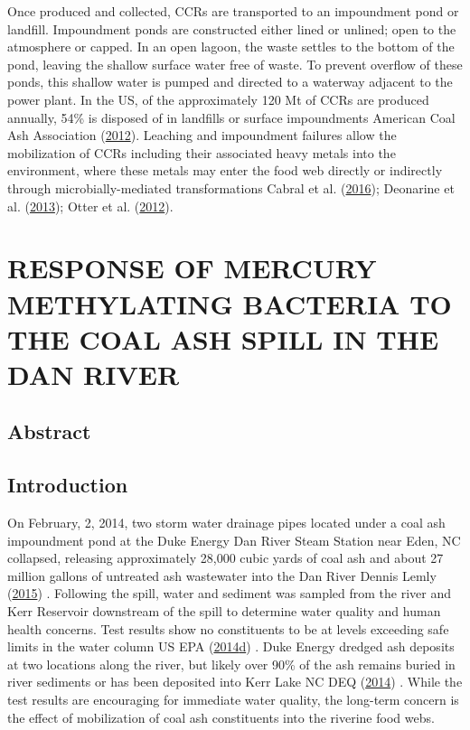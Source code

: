 \documentclass[ms]{uncgdissertationexp}
\theoremstyle{plain}
\theoremstyle{definition}
\theoremstyle{remark}
\begin{document}
  Once produced and collected, CCRs are transported to an impoundment pond
  or landfill. Impoundment ponds are constructed either lined or unlined;
  open to the atmosphere or capped. In an open lagoon, the waste settles
  to the bottom of the pond, leaving the shallow surface water free of
  waste. To prevent overflow of these ponds, this shallow water is pumped
  and directed to a waterway adjacent to the power plant. In the US, of
  the approximately 120 Mt of CCRs are produced annually, 54\% is disposed
  of in landfills or surface impoundments American Coal Ash Association
  (\protect\hyperlink{ref-americancoalashassociation2012CoalCombustion2012}{2012}).
  Leaching and impoundment failures allow the mobilization of CCRs
  including their associated heavy metals into the environment, where
  these metals may enter the food web directly or indirectly through
  microbially-mediated transformations Cabral et al.
  (\protect\hyperlink{ref-cabralMethylmercuryDegradationPseudomonas2016}{2016});
  Deonarine et al.
  (\protect\hyperlink{ref-deonarineEnvironmentalImpactsTennessee2013}{2013});
  Otter et al.
  (\protect\hyperlink{ref-otterTrophicStatusMetal2012}{2012}).
  
  \chapter{RESPONSE OF MERCURY METHYLATING BACTERIA TO THE COAL ASH SPILL
  IN THE DAN RIVER}\label{pcr}
  
  \section{Abstract}\label{abstract}
  
  \section{Introduction}\label{introduction}
  
  On February, 2, 2014, two storm water drainage pipes located under a
  coal ash impoundment pond at the Duke Energy Dan River Steam Station
  near Eden, NC collapsed, releasing approximately 28,000 cubic yards of
  coal ash and about 27 million gallons of untreated ash wastewater into
  the Dan River Dennis Lemly
  (\protect\hyperlink{ref-dennislemlyDamageCostDan2015}{2015}) . Following
  the spill, water and sediment was sampled from the river and Kerr
  Reservoir downstream of the spill to determine water quality and human
  health concerns. Test results show no constituents to be at levels
  exceeding safe limits in the water column US EPA
  (\protect\hyperlink{ref-usepaEPAResponseDuke2014}{2014}\protect\hyperlink{ref-usepaEPAResponseDuke2014}{d})
  . Duke Energy dredged ash deposits at two locations along the river, but
  likely over 90\% of the ash remains buried in river sediments or has
  been deposited into Kerr Lake NC DEQ
  (\protect\hyperlink{ref-ncdeqRapidResponseTimeline2014}{2014}) . While
  the test results are encouraging for immediate water quality, the
  long-term concern is the effect of mobilization of coal ash constituents
  into the riverine food webs.
  
\end{document}
